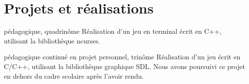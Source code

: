 \documentclass[11pt,a4paper]{moderncv}
\begin{document}


\vspace{-1mm}
\section{Projets et réalisations}
\vspace{-1mm}

        {pédagogique, quadrinôme}{}{}{
          Réalisation d'un jeu en terminal écrit en C++, utilisant la bibliothèque ncurses.
        }

        {pédagogique continué en projet personnel, trinôme}{}{}{
          Réalisation d'un jeu écrit en C/C++, utilisant la bibliothèque graphique SDL.
          Nous avons poursuivi ce projet en dehors du cadre scolaire après l'avoir rendu.
        }
        
\end{document}

